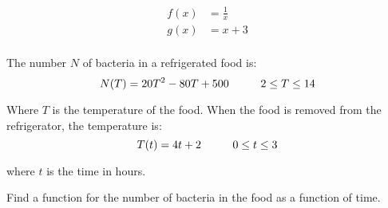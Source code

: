 \documentclass[fleqn,addpoints]{exam}
\begin{document}
\begin{questions}
\question 
\begin{align*}
  f(x) &= \frac{1}{x} \\
  g(x) &= x+3 \\
\end{align*}
\vspace{2 cm}

\question
The number $N$ of bacteria in a refrigerated food is:
\[
  N(T) = 20T^2 - 80T + 500  \hspace{1 cm} 2 \leq T \leq 14
\]

Where $T$ is the temperature of the food.  When the food is removed from the refrigerator, the temperature is:
\[
  T(t) = 4t + 2 \hspace{1 cm} 0 \leq t \leq 3
\]
\end{questions}

where $t$ is the time in hours.

Find a function for the number of bacteria in the food as a function of time.
\end{document}
